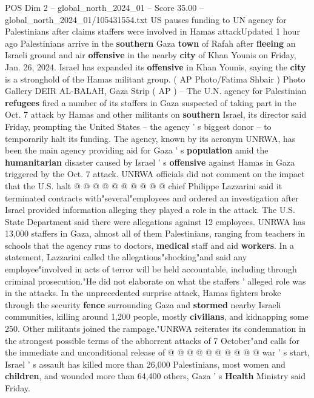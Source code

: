 \begin{textsample}{POS Dim 2 – global\_north\_2024\_01 – Score 35.00 – global\_north\_2024\_01/105431554.txt}  \label{ex:f2_pos_201}
US pauses funding to UN agency for Palestinians after claims staffers were involved in Hamas attackUpdated 1 hour ago Palestinians arrive in the \textbf{southern} Gaza \textbf{town} of Rafah after \textbf{fleeing} an Israeli ground and air \textbf{offensive} in the nearby \textbf{city} of Khan Younis on Friday, Jan. 26, 2024.
Israel has expanded its \textbf{offensive} in Khan Younis, saying the \textbf{city} is a stronghold of the Hamas militant group. ( AP Photo/Fatima Shbair ) Photo Gallery DEIR AL-BALAH, Gaza Strip ( AP ) -- The U.N. agency for Palestinian \textbf{refugees} fired a number of its staffers in Gaza suspected of taking part in the Oct. 7 attack by Hamas and other militants on \textbf{southern} Israel, its director said Friday, prompting the United States -- the agency ' s biggest donor -- to temporarily halt its funding.
The agency, known by its acronym UNRWA, has been the main agency providing aid for Gaza ' s \textbf{population} amid the \textbf{humanitarian} disaster caused by Israel ' s \textbf{offensive} against Hamas in Gaza triggered by the Oct. 7 attack.
UNRWA officials did not comment on the impact that the U.S. halt @ @ @ @ @ @ @ @ @ @ chief Philippe Lazzarini said it terminated contracts with"several"employees and ordered an investigation after Israel provided information alleging they played a role in the attack.
The U.S.
State Department said there were allegations against 12 employees.
UNRWA has 13,000 staffers in Gaza, almost all of them Palestinians, ranging from teachers in schools that the agency runs to doctors, \textbf{medical} staff and aid \textbf{workers}.
In a statement, Lazzarini called the allegations"shocking"and said any employee"involved in acts of terror will be held accountable, including through criminal prosecution."He did not elaborate on what the staffers ' alleged role was in the attacks.
In the unprecedented surprise attack, Hamas fighters broke through the security \textbf{fence} surrounding Gaza and \textbf{stormed} nearby Israeli communities, killing around 1,200 people, mostly \textbf{civilians}, and kidnapping some 250.
Other militants joined the rampage."UNRWA reiterates its condemnation in the strongest possible terms of the abhorrent attacks of 7 October"and calls for the immediate and unconditional release of @ @ @ @ @ @ @ @ @ @ war ' s start, Israel ' s assault has killed more than 26,000 Palestinians, most women and \textbf{children}, and wounded more than 64,400 others, Gaza ' s \textbf{Health} Ministry said Friday.

\end{textsample}
